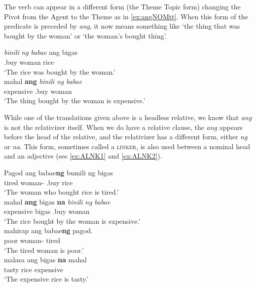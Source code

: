 \documentclass[output=paper]{langsci/langscibook}
\begin{document}
The verb can appear in a different form (the Theme Topic form) changing the
Pivot from the Agent to the Theme as in \eqref{ex:angNOMtt}.  When this form of
the predicate is preceded by \emph{ang}, it now means something like `the thing
that was bought by the woman' or `the woman's bought thing'.

\ea {}
    \ea
    \gll \emph{binili} \emph{ng} \emph{babae} ang bigas\label{ex:angNOMtt}\\
    \Tto{}.buy \Gen{} woman \Nom{} rice\\
    \glt `The rice was bought by the woman.'\\
    \ex
    \gll mahal \textbf{ang} \emph{binili} \emph{ng} \emph{babae}\\
    expensive \Nom{} \Tto{}.buy \Gen{} woman\\
    \glt `The thing bought by the woman is expensive.'
    \z
\z

While one of the translations given above is a headless relative, we know that
\emph{ang} is not the relativizer itself.   When we do have a relative clause,
the \emph{ang} appears before the head of the relative, and the relativizer has
a different form, either \emph{ng} or \emph{na}.  This form, sometimes called a
\textsc{linker}, is also used between a nominal head and an adjective (see
\ref{ex:ALNK1} and \ref{ex:ALNK2}).

\ea {} \label{ex:relcl}
    \ea
    \gll  Pagod ang babae\textbf{ng} bumili ng bigas\\
    tired \Nom{} woman-\Rel{} \At{}.buy \Acc{} rice\\
    \glt `The woman who bought rice is tired.' \\
    \ex
    \gll mahal \textbf{ang} bigas \textbf{na} \emph{binili} \emph{ng} \emph{babae}\\
    expensive \Nom{} bigas \Rel{} \Tto{}.buy \Gen{} woman\\
    \glt `The rice bought by the woman is expensive.' \\
    \ex
    \gll  mahirap ang babae\textbf{ng} pagod.\label{ex:ALNK1}\\
    poor \Nom{} woman-\Lnk{} tired\\
    \glt `The tired woman is poor.' \\
    \ex
    \gll malasa ang bigas \textbf{na} mahal\label{ex:ALNK2}\\
    tasty \Nom{} rice \Lnk{} expensive\\
    \glt `The expensive rice is tasty.'
    \z
\z
\end{document}
